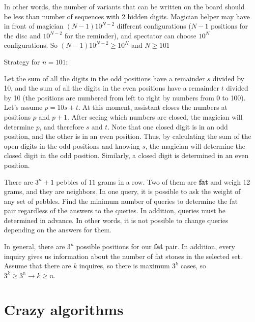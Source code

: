 In other words, the number of variants that can be written on the board should be less than number of sequences with 2 hidden digits. Magician helper may have in front of magician $(N-1)10^{N-2}$ different configurations ($N-1$ positions for the disc and $10^{N-2}$ for the reminder), and spectator can choose $10^{N}$ configurations. So $(N-1)10^{N-2}\geq 10^{N}$ and $N\geq 101$

Strategy for $n=101$:

Let the sum of all the digits in the odd positions have a remainder $s$ divided by 10, and the sum of all the digits in the even positions have a remainder $t$ divided by 10 (the positions are numbered from left to right by numbers from 0 to 100). Let's assume $p = 10s + t$. At this moment, assistant closes the numbers at positions $p$ and $p + 1$.  After seeing which numbers are closed, the magician will determine $p$, and therefore $s$ and $t$. Note that one closed digit is in an odd position, and the other is in an even position. Thus, by calculating the sum of the open digits in the odd positions and knowing $s$, the magician will determine the closed digit in the odd position. Similarly, a closed digit is determined in an even position.

\begin{example} [IMSC 2025]
    There are $3^n+1$ pebbles of $11$ grams in a row. Two of them are \textbf{fat} and weigh 12 grams, and they are neighbors. In one query, it is possible to ask the weight of any set of pebbles. Find the minimum number of queries to determine the fat pair regardless of the answers to the queries. In addition, queries must be determined in advance. In other words, it is not possible to change queries depending on the answers for them. 
\end{example}

\sol In general, there are $3^n$ possible positions for our \textbf{fat} pair. In addition, every inquiry gives us information about the number of fat stones in the selected set. Assume that there are $k$ inquires, so there is maximum $3^k$ cases, so $3^k \geq 3^n \rightarrow k\geq n$. 

\section{Crazy algorithms}


